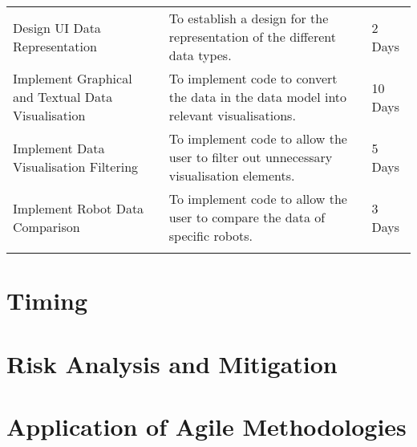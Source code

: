 \begin{table}
\begin{tabular}[H]{ >{\raggedright}p{5cm}>{\raggedright}p{7cm}p{3cm} }
  Design UI Data Representation 					& To establish a design for the representation of the different data types. 											& 2 Days \\
  Implement Graphical and Textual Data Visualisation & To implement code to convert the data in the data model into relevant visualisations. 								& 10 Days \\
  Implement Data Visualisation Filtering 			& To implement code to allow the user to filter out unnecessary visualisation elements. 								& 5 Days \\
  Implement Robot Data Comparison 					& To implement code to allow the user to compare the data of specific robots. 											& 3 Days \\
		\bottomrule\\
	\end{tabular}
\end{table}


\section{Timing}



\section{Risk Analysis and Mitigation}



\section{Application of Agile Methodologies} \label{Agile}